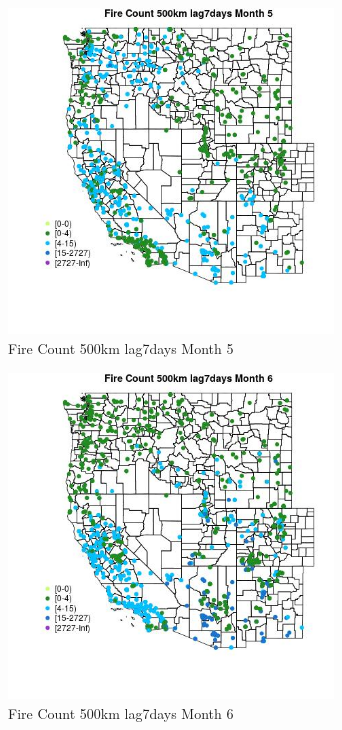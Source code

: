 \begin{figure} 
\centering  
\includegraphics[width=0.77\textwidth]{Code_Outputs/Report_ML_input_PM25_Step4_part_f_de_duplicated_aveswNAs_MapObsMo5Fire_Count_500km_lag7days.jpg} 
\caption{\label{fig:Report_ML_input_PM25_Step4_part_f_de_duplicated_aveswNAsMapObsMo5Fire_Count_500km_lag7days}Fire Count 500km lag7days Month 5} 
\end{figure} 
 

\clearpage 

\begin{figure} 
\centering  
\includegraphics[width=0.77\textwidth]{Code_Outputs/Report_ML_input_PM25_Step4_part_f_de_duplicated_aveswNAs_MapObsMo6Fire_Count_500km_lag7days.jpg} 
\caption{\label{fig:Report_ML_input_PM25_Step4_part_f_de_duplicated_aveswNAsMapObsMo6Fire_Count_500km_lag7days}Fire Count 500km lag7days Month 6} 
\end{figure} 
 

